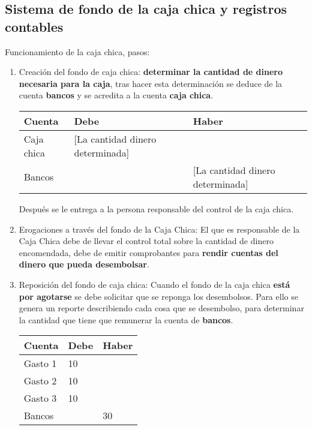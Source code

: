 \documentclass{article}
\begin{document}
\subsection{Sistema de fondo de la caja chica y registros contables}
Funcionamiento de la caja chica, pasos:
\begin{enumerate}
    \item Creación del fondo de caja chica: \textbf{determinar la cantidad de dinero necesaria para la caja}, tras hacer esta determinación se deduce de la cuenta \textbf{bancos} y se acredita a la cuenta \textbf{caja chica}.
    \begin{center}
    \begin{tabular}{ | p{9cm} | p{3cm} | p{3cm} | }
     \hline
    Cuenta & Debe & Haber \\
    \hline
    Caja chica & [La cantidad dinero determinada] & \\ 
    \hline
    Bancos & & [La cantidad dinero determinada] \\ 
     \hline
    \end{tabular}
    \end{center}
    Después se le entrega a la persona responsable del control de la caja chica.
    
    \item Erogaciones a través del fondo de la Caja Chica: El que es responsable de la Caja Chica debe de llevar el control total sobre la cantidad de dinero encomendada, debe de emitir comprobantes para \textbf{rendir cuentas del dinero que pueda desembolsar}.

    
    \item Reposición del fondo de caja chica: Cuando el fondo de la caja chica \textbf{está por agotarse} se debe solicitar que se reponga los desembolsos. Para ello se genera un reporte describiendo cada cosa que se desembolso, para determinar la cantidad que tiene que remunerar la cuenta de \textbf{bancos}.
    \begin{center}
    \begin{tabular}{ | p{9cm} | p{3cm} | p{3cm} | }
     \hline
    Cuenta & Debe & Haber  \\
    \hline
    Gasto 1 & 10 & \\ 
    Gasto 2 & 10 & \\ 
    Gasto 3 & 10 & \\ 
    Bancos & & 30\\ 
    \hline
    \end{tabular}
    \end{center}


\end{enumerate}
\end{document}
